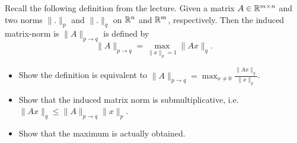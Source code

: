 \documentclass{ExerciseSheet}
\newif\ifsolutions
\begin{document}
\ifsolutions
\vskip 0.3cm
\begin{solution}
If $y=0$ then the statement is clear as both sides of the inequality are zero. \\
Otherwise we set $z:=x - \frac{\inner{y}{x}}{\inner{y}{y}}$. Then 
\begin{equation*}
    \inner{z}{y} = \inner{x}{y} - \frac{\inner{y}{x}}{\inner{y}{y} }\inner{y}{y} = 0.
\end{equation*}
Which yields 
\begin{align*}
    \|x\|_2^2 &= \left\|\frac{\inner{y}{x}}{\inner{y}{y} } y + z \right\|_2^2 \\
    &= \inner{\frac{\inner{y}{x}}{\inner{y}{y} } y + z }{\frac{\inner{y}{x}}{\inner{y}{y} } y + z } \\
    &= \left|\frac{\inner{y}{x}}{\inner{y}{y} }\right|^2\langle y,y\rangle + 2 \frac{\inner{y}{x}}{\inner{y}{y} }\langle y, z \rangle + \langle z, z \rangle \\
    &= \frac{\left|\inner{y}{x}\right|^2}{\|y\|_2^2 }+ \|z\|_2^2 \\
    &\geq \frac{\left|\inner{y}{x}\right|^2}{\|y\|_2^2 }.
\end{align*}
Multiplying both sides with $\|y\|_2^2$ and taking the square root yields the result. \\

Notice that we have equality iff $z=0$, which is the case if $x,y$ are linearly dependent. 
\end{solution}

\fi
\vskip 0.5cm

\begin{exo}
Recall the following definition from the lecture. Given a matrix $A\in \mathbb{R}^{m\times n}$ and two norms $\| .\|_p$ and $\|.\|_q$ on $\mathbb{R}^n$ and $\mathbb{R}^m$, respectively. Then the induced matrix-norm is  $\|A\|_{p\rightarrow q} $ is defined by 
\begin{equation*}
    \|A\|_{p\rightarrow q} = \max_{\|x\|_p=1} \|Ax\|_q.
\end{equation*}
\begin{itemize}
 \item Show the definition is equivalent to $\|A\|_{p\rightarrow q} = \max_{x\neq 0} \frac{\|Ax\|_q}{\|x\|_p}$.
\item Show that the induced matrix norm is submultiplicative, i.e. $\|Ax\|_q \leq \|A\|_{p\rightarrow q} \|x\|_p$.
    \item Show that the maximum is actually obtained. 
   
    
\end{itemize}
\end{exo}
\end{document}
